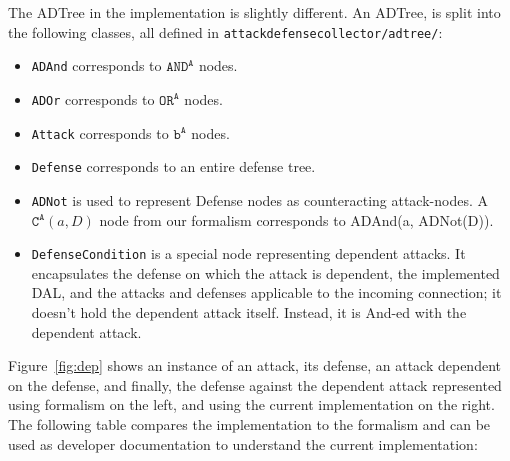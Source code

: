 \documentclass{article}
\begin{document}
	The ADTree in the 
	implementation is slightly different.
	An ADTree, is split into the following 
	classes, all defined in 
	\texttt{attackdefensecollector/adtree/}:
	\begin{itemize}
		\item \texttt{ADAnd} corresponds to
		 $\texttt{AND}^{\texttt{A}}$ nodes.
		\item \texttt{ADOr} corresponds to
		$\texttt{OR}^{\texttt{A}}$ nodes.
		\item \texttt{Attack} corresponds to 
		$\texttt{b}^{\texttt{A}}$ nodes.
		\item \texttt{Defense} corresponds to an
		entire defense tree.
		\item \texttt{ADNot} is used to represent 
		Defense nodes as counteracting 
		attack-nodes. A 
		$\texttt{C}^{\texttt{A}}(a, D)$ node 
		from our formalism corresponds 
		to ADAnd(a, ADNot(D)).
		\item \texttt{DefenseCondition} is a special
		node representing dependent attacks.
		It encapsulates the defense on 
		which the attack is dependent, 
		the implemented DAL, and the attacks
		and defenses applicable to the 
		incoming connection; it doesn't hold 
		the dependent attack itself. Instead, 
		it is And-ed with the dependent attack.
	\end{itemize}
	Figure~\ref{fig:dep} shows an instance of 
	an attack, its defense, an attack
	dependent on the defense, and finally, 
	the defense against the dependent attack
	represented using formalism on the left, 
	and using the current implementation on 
	the right.
	The following table compares the 
	implementation to the formalism and can be 
	used as developer documentation to understand
	the current implementation:
\end{document}

